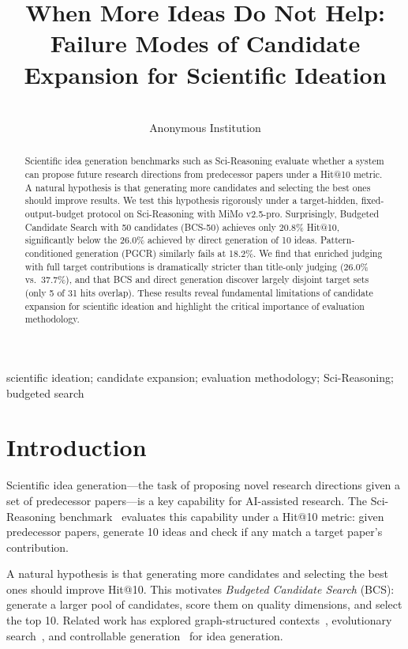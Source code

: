 \documentclass[wcp]{jmlr}
\title[When More Ideas Do Not Help]{When More Ideas Do Not Help: Failure Modes of Candidate Expansion for Scientific Ideation}
\author{\Name{Anonymous Author}\Email{anonymous@submission}\\
\addr Anonymous Institution}
\begin{document}
\makeatletter
\let \@jmlrpages \@empty
\makeatother

\maketitle

\begin{abstract}
Scientific idea generation benchmarks such as Sci-Reasoning evaluate whether a system can propose future research directions from predecessor papers under a Hit@10 metric. A natural hypothesis is that generating more candidates and selecting the best ones should improve results. We test this hypothesis rigorously under a target-hidden, fixed-output-budget protocol on Sci-Reasoning with MiMo v2.5-pro. Surprisingly, Budgeted Candidate Search with 50 candidates (BCS-50) achieves only 20.8\% Hit@10, significantly below the 26.0\% achieved by direct generation of 10 ideas. Pattern-conditioned generation (PGCR) similarly fails at 18.2\%. We find that enriched judging with full target contributions is dramatically stricter than title-only judging (26.0\% vs.\ 37.7\%), and that BCS and direct generation discover largely disjoint target sets (only 5 of 31 hits overlap). These results reveal fundamental limitations of candidate expansion for scientific ideation and highlight the critical importance of evaluation methodology.
\end{abstract}
\begin{keywords}
scientific ideation; candidate expansion; evaluation methodology; Sci-Reasoning; budgeted search
\end{keywords}

\section{Introduction}\label{sec:intro}

Scientific idea generation---the task of proposing novel research directions given a set of predecessor papers---is a key capability for AI-assisted research. The Sci-Reasoning benchmark~\cite{liu2025scireasoning} evaluates this capability under a Hit@10 metric: given predecessor papers, generate 10 ideas and check if any match a target paper's contribution.

A natural hypothesis is that generating more candidates and selecting the best ones should improve Hit@10. This motivates \emph{Budgeted Candidate Search} (BCS): generate a larger pool of candidates, score them on quality dimensions, and select the top 10. Related work has explored graph-structured contexts~\cite{graph2idea}, evolutionary search~\cite{flowpie}, and controllable generation~\cite{ldc} for idea generation.
\end{document}
